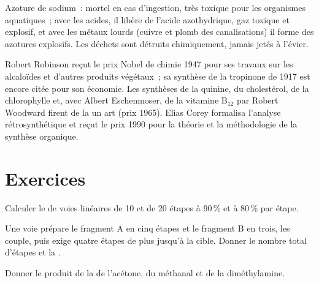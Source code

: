\begin{safety}{}
Azoture de sodium~: mortel en cas d'ingestion, très toxique pour les
organismes aquatiques~; avec les acides, il libère de l'acide
azothydrique, gaz toxique et explosif, et avec les métaux lourds (cuivre et
plomb des canalisations) il forme des azotures explosifs. Les déchets sont
détruits chimiquement, jamais jetés à l'évier.
\end{safety}

\begin{history}
Robert Robinson reçut le prix Nobel de chimie 1947 pour ses travaux sur les
alcaloïdes et d'autres produits végétaux~; sa synthèse de la tropinone de
1917 est encore citée pour son économie. Les synthèses de la quinine, du
cholestérol, de la chlorophylle et, avec Albert Eschenmoser, de la vitamine $\mathrm B_{12}$ par Robert Woodward firent de la  un art
(prix 1965). Elias Corey formalisa l'analyse rétrosynthétique et reçut le
prix 1990 pour la théorie et la méthodologie de la synthèse organique.
\end{history}

\section{Exercices}

\begin{exercise}[$\star$]\label{exo:b3:total-synthesis:1}
Calculer le  de voies linéaires de 10 et de 20 étapes à
90\,\% et à 80\,\% par étape.
\end{exercise}

\begin{exercise}[$\star$]\label{exo:b3:total-synthesis:2}
Une voie prépare le fragment A en cinq étapes et le fragment B en trois,
les couple, puis exige quatre étapes de plus jusqu'à la cible. Donner le
nombre total d'étapes et la .
\end{exercise}

\begin{exercise}[$\star$]\label{exo:b3:total-synthesis:3}
Donner le produit de la  de l'acétone, du méthanal et
de la diméthylamine.
\end{exercise}

